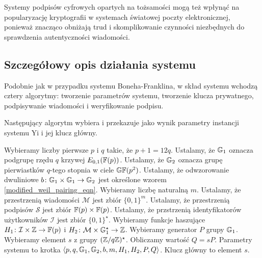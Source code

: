 \noindent
Systemy podpisów cyfrowych opartych na tożsamości
mogą też wpłynąć na popularyzację kryptografii
w systemach światowej poczty elektronicznej,
ponieważ znacząco obniżają trud i skomplikowanie
czynności niezbędnych do sprawdzenia autentyczności wiadomości.

\subsection*{Szczegółowy opis działania systemu}

\noindent
Podobnie jak w przypadku systemu Boneha-Franklina,
w skład systemu wchodzą cztery algorytmy:
tworzenie parametrów systemu, tworzenie klucza prywatnego,
podpisywanie wiadomości i weryfikowanie podpisu.

\begin{algorithm}
Następujący algorytm wybiera i przekazuje jako wynik
parametry instancji systemu Yi
i jej klucz główny.

\begin{codebox}
\li
Wybieramy liczby pierwsze $p$ i $q$ takie,
że $p+1 = 12q$.
\li
Ustalamy, że $\mathbb{G}_1$ oznacza podgrupę rzędu $q$ krzywej $E_{0,1}(\mathbb{F}(p))$.
\li
Ustalamy, że $\mathbb{G}_2$ oznacza grupę pierwiastków $q$-tego stopnia w ciele $\mathbb{GF}(p^2)$.
\li
Ustalamy, że odwzorowanie dwuliniowe $b\colon \mathbb{G}_1 \times \mathbb{G}_1 \to \mathbb{G}_2$
jest określone wzorem \ref{modified_weil_pairing_eqn}.
\li
Wybieramy liczbę naturalną $m$.
\li
Ustalamy, że przestrzenią wiadomości $\mathcal{M}$
jest zbiór $\{0, 1\}^m$.
\li
Ustalamy, że przestrzenią podpisów $\mathcal{S}$
jest zbiór $\mathbb{F}(p) \times \mathbb{F}(p)$.
\li
Ustalamy, że przstrzenią identyfikatorów użytkowników $\mathcal{I}$
jest zbiór $\{0, 1\}^\star$.
\li
Wybieramy funkcje haszujące
$H_1\colon \mathcal{I} \times \mathbb{Z} \to \mathbb{F}(p)$
i $H_2\colon \mathcal{M} \times \mathbb{G}_1^\star \to \mathbb{Z}$.
\li
Wybieramy generator $P$ grupy $\mathbb{G}_1$.
\li
Wybieramy element $s$ z grupy $(\mathbb{Z}/q\mathbb{Z})^\star$.
\li
Obliczamy wartość $Q = sP$.
\li
Parametry systemu to krotka
$\left\langle p, q, \mathbb{G}_1, \mathbb{G}_2, b, m, H_1, H_2, P, Q \right\rangle$.
\li
Klucz główny to element $s$.
\end{codebox}
\end{algorithm}

